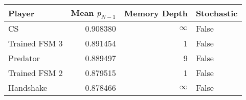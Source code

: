 \begin{tabular}{lrrl}
\toprule
        Player &  Mean $p_{N-1}$ &  Memory Depth & Stochastic \\
\midrule
            CS &        0.908380 &            \(\infty\) &      False \\
 Trained FSM 3 &        0.891454 &             1 &      False \\
      Predator &        0.889497 &             9 &      False \\
 Trained FSM 2 &        0.879515 &             1 &      False \\
     Handshake &        0.878466 &            \(\infty\) &      False \\
\bottomrule
\end{tabular}
